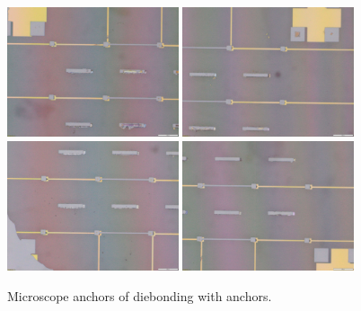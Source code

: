 \begin{figure}
    \centering
        \includegraphics[width=0.45\textwidth]{Main/Ch2/anchors/TL.jpg}
        \includegraphics[width=0.45\textwidth]{Main/Ch2/anchors/TR.jpg}
        \includegraphics[width=0.45\textwidth]{Main/Ch2/anchors/BL.jpg}
        \includegraphics[width=0.45\textwidth]{Main/Ch2/anchors/BR.jpg}
    \caption{Microscope anchors of diebonding with anchors.}
    \label{fig:anchored_samples}
\end{figure}
